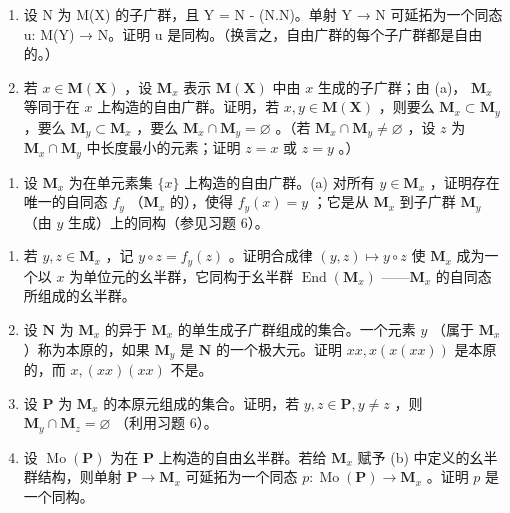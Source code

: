 \begin{enumerate}
\def\labelenumi{(\alph{enumi})}
\item
  设 N 为 M(X) 的子广群，且 Y = N - (N.N)。单射 Y → N 可延拓为一个同态 u: M(Y) → N。证明 u 是同构。（换言之，自由广群的每个子广群都是自由的。）
\item
  若 \(x \in \mathbf{M}(\mathbf{X})\) ，设 \(\mathbf{M}_x\) 表示 \(\mathbf{M}(\mathbf{X})\) 中由 \(x\) 生成的子广群；由 (a)， \(\mathbf{M}_x\) 等同于在 \(x\) 上构造的自由广群。证明，若 \(x, y \in \mathbf{M}(\mathbf{X})\) ，则要么 \(\mathbf{M}_x \subset \mathbf{M}_y\) ，要么 \(\mathbf{M}_y \subset \mathbf{M}_x\) ，要么 \(\mathbf{M}_x \cap \mathbf{M}_y = \varnothing\) 。（若 \(\mathbf{M}_x \cap \mathbf{M}_y \neq \varnothing\) ，设 \(z\) 为 \(\mathbf{M}_x \cap \mathbf{M}_y\) 中长度最小的元素；证明 \(z = x\) 或 \(z = y\) 。）
\end{enumerate}

\begin{enumerate}
\def\labelenumi{\arabic{enumi}.}
\setcounter{enumi}{6}
\tightlist
\item
  设 \(\mathbf{M}_x\) 为在单元素集 \(\{x\}\) 上构造的自由广群。(a) 对所有 \(y \in \mathbf{M}_x\) ，证明存在唯一的自同态 \(f_y\) （\(\mathbf{M}_x\) 的），使得 \(f_y(x) = y\) ；它是从 \(\mathbf{M}_x\) 到子广群 \(\mathbf{M}_y\) （由 \(y\) 生成）上的同构（参见习题 6）。
\end{enumerate}

\begin{enumerate}
\def\labelenumi{(\alph{enumi})}
\setcounter{enumi}{1}
\item
  若 \(y, z \in \mathbf{M}_x\) ，记 \(y \circ z = f_y(z)\) 。证明合成律 \((y, z) \mapsto y \circ z\) 使 \(\mathbf{M}_x\) 成为一个以 \(x\) 为单位元的幺半群，它同构于幺半群 \(\operatorname{End}(\mathbf{M}_x)\) ——\(\mathbf{M}_x\) 的自同态所组成的幺半群。
\item
  设 \(\mathbf{N}\) 为 \(\mathbf{M}_x\) 的异于 \(\mathbf{M}_x\) 的单生成子广群组成的集合。一个元素 \(y\) （属于 \(\mathbf{M}_x\) ）称为本原的，如果 \(\mathbf{M}_y\) 是 \(\mathbf{N}\) 的一个极大元。证明 \(xx, x(x(xx))\) 是本原的，而 \(x, (xx)(xx)\) 不是。
\item
  设 \(\mathbf{P}\) 为 \(\mathbf{M}_x\) 的本原元组成的集合。证明，若 \(y, z \in \mathbf{P}, y \neq z\) ，则 \(\mathbf{M}_y \cap \mathbf{M}_z = \varnothing\) （利用习题 6）。
\item
  设 \(\operatorname{Mo}(\mathbf{P})\) 为在 \(\mathbf{P}\) 上构造的自由幺半群。若给 \(\mathbf{M}_x\) 赋予 (b) 中定义的幺半群结构，则单射 \(\mathbf{P} \to \mathbf{M}_x\) 可延拓为一个同态 \(p: \operatorname{Mo}(\mathbf{P}) \to \mathbf{M}_x\) 。证明 \(p\) 是一个同构。
\end{enumerate}

